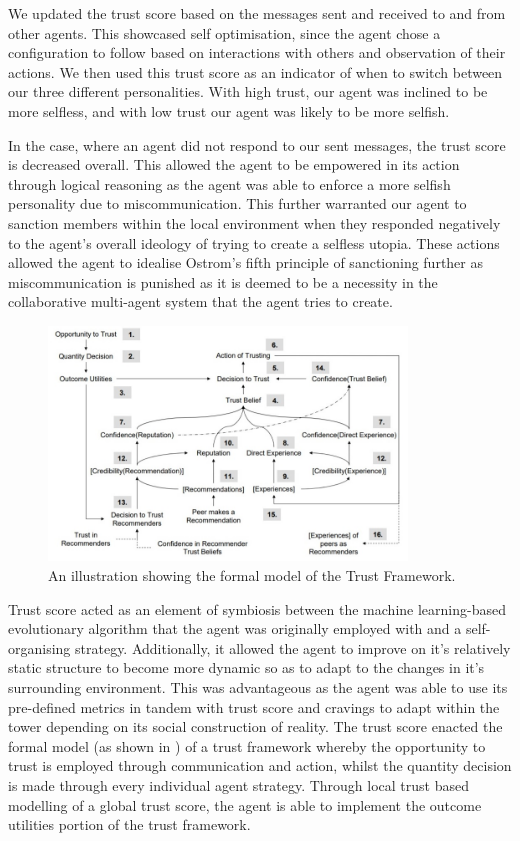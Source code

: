 We updated the trust score based on the messages sent and received to and from other agents. This showcased self optimisation, since the agent chose a configuration to follow based on interactions with others and observation of their actions. We then used this trust score as an indicator of when to switch between our three different personalities. With high trust, our agent was inclined to be more selfless, and with low trust our agent was likely to be more selfish.

In the case, where an agent did not respond to our sent messages, the trust score is decreased overall. This allowed the agent to be empowered in its action through logical reasoning as the agent was able to enforce a more selfish personality due to miscommunication. This further warranted our agent to sanction members within the local environment when they responded negatively to the agent's overall ideology of trying to create a selfless utopia. These actions allowed the agent to idealise Ostrom's fifth principle of sanctioning further as miscommunication is punished as it is deemed to be a necessity in the collaborative multi-agent system that the agent tries to create.

\begin{figure}[htb]
    \centering
    \includegraphics[width=0.85\textwidth]{006_team_4_agent_design/assets/JeremyPittTrustFramework.jpg}
    \caption{An illustration showing the formal model of the Trust Framework. \cite{JeremyPittSlides}}
    \label{fig:TrustFramework}
\end{figure}

Trust score acted as an element of symbiosis between the machine learning-based evolutionary algorithm that the agent was originally employed with and a self-organising strategy. Additionally, it allowed the agent to improve on it's relatively static structure to become more dynamic so as to adapt to the changes in it's surrounding environment. This was advantageous as the agent was able to use its pre-defined metrics in tandem with trust score and cravings to adapt within the tower depending on its social construction of reality. The trust score enacted the formal model (as shown in ) of a trust framework whereby the opportunity to trust is employed through communication and action, whilst the quantity decision is made through every individual agent strategy. Through local trust based modelling of a global trust score, the agent is able to implement the outcome utilities portion of the trust framework.

